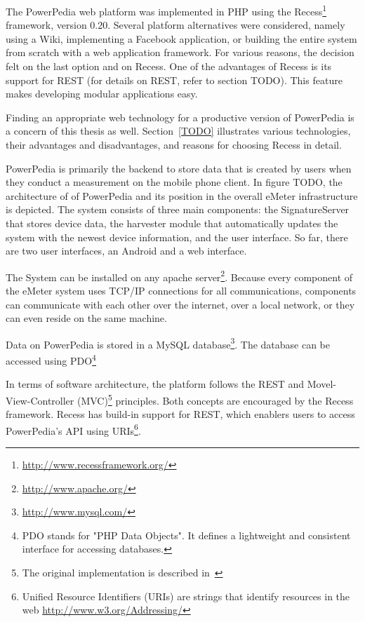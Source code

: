 The PowerPedia web platform was implemented in PHP using the Recess\footnote{\url{http://www.recessframework.org/}} framework, version 0.20. Several platform alternatives were considered, namely using a Wiki, implementing a Facebook application, or building the entire system from scratch with a web application framework. For various reasons, the decision felt on the last option and on Recess. 
One of the advantages of Recess is its support for REST (for details on REST, refer to section TODO). This feature makes developing modular applications easy.

Finding an appropriate web technology for a productive version of PowerPedia is a concern of this thesis as well. Section~\ref{TODO} illustrates various technologies, their advantages and disadvantages, and reasons for choosing Recess in detail.  
  
PowerPedia is primarily the backend to store data that is created by users when they conduct a measurement on the mobile phone client. In figure TODO, the architecture of of PowerPedia and its position in the overall eMeter infrastructure is depicted. The system consists of three main components: the SignatureServer that stores device data, the harvester module that automatically updates the system with the newest device information, and the user interface. So far, there are two user interfaces, an Android and a web interface. 

The System can be installed on any apache server\footnote{\url{http://www.apache.org/}}. Because every component of the eMeter system uses TCP/IP connections for all communications, components can communicate with each other over the internet, over a local network, or they can even reside on the same machine.

Data on PowerPedia is stored in a MySQL database\footnote{\url{http://www.mysql.com/}}. The database can be accessed using PDO\footnote{PDO stands for "PHP Data Objects". It defines a lightweight and consistent interface for accessing databases\cite{merklepp}.}

In terms of software architecture, the platform follows the REST\cite{Fielding2000} and Movel-View-Controller (MVC)\footnote{The original implementation is described in~\cite{burbeck87}} principles. Both concepts are encouraged by the Recess framework. Recess has build-in support for REST, which enablers users to access PowerPedia's API using URIs\footnote{Unified Resource Identifiers (URIs) are strings that identify resources in the web \url{http://www.w3.org/Addressing/}}\cite{weiss:inprocPUC:2012}. 
 
